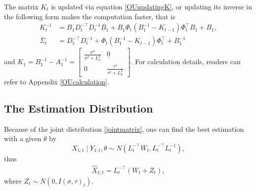 The matrix $K_{t}$ is updated via equation \eqref{OUupdatingK}, or updating its inverse in the following form makes the computation faster, that is 
\begin{align*}
K_{t}^{-1} &= B_1D_{t}^{-\top}D_{t}^{-1}B_1 + B_1\Phi_{t} \left(B_1^{-1} - K_{t-1}\right) \Phi_{t}^\top B_1+ B_1,\\
\bar{\Sigma}_{t} &= D_{t}^{-\top}D_{t}^{-1}+ \Phi_{t} \left(B_1^{-1} - K_{t-1}\right) \Phi_{t}^\top + B_1^{-1}
\end{align*}
and $K_1 =B_1^{-1} - A_1^{-1} = \begin{bmatrix}
\frac{\sigma^4}{\sigma^2 +L_x^2} & 0 \\ 0 &\frac{\tau^4}{\tau^2 +L_u^2}
\end{bmatrix} $. For calculation details, readers can refer to Appendix \ref{OUcalculation}. 


\subsection{The Estimation Distribution}

Because of the joint distribution \eqref{jointmatrix}, one can find the best estimation with a given $\theta$ by
\begin{equation*}
X_{1:t} \mid Y_{1:t},\theta \sim N\left(L_t^{-\top}W_t,L_t^{-\top}L_t^{-1}\right),
\end{equation*}
thus
\begin{align*}
\hat{X} _{1:t}= L_t^{-\top}\left(W_t+Z_t\right),
\end{align*}
where $Z_t \sim N\left(0, I(\sigma,\tau)_t\right)$.

